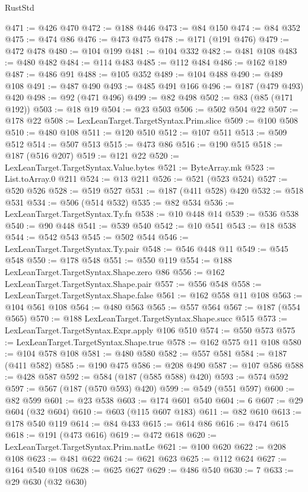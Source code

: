 \begin{lexlean}{RustStd}
\begin{coremodule}
{\begin{coremodule}
{{{{{{{{{{{{{{{{{{{{{{{{{{{{{{{{{{{{{{{{{{{{{{{{{{{{{{{@471 := @426 @470
@472 := @188 @446
@473 := @84 @150
@474 := @84 @352
@475 := @474 @86
@476 := @473 @475
@478 := @171 (@191 @476)
@479 := @472 @478
@480 := @104 @199
@481 := @104 @332
@482 := @481 @108
@483 := @480 @482
@484 := @114 @483
@485 := @112 @484
@486 := @162 @189
@487 := @486 @91
@488 := @105 @352
@489 := @104 @488
@490 := @489 @108
@491 := @487 @490
@493 := @485 @491 @166
@496 := @187 (@479 @493) @420
@498 := @92 (@471 @496)
@499 := @82 @498
@502 := @83 (@85 (@171 @192))
@503 := @18 @19
@504 := @23 @503
@506 := @502 @504 @22
@507 := @178 @22
@508 := LexLeanTarget.TargetSyntax.Prim.slice
@509 := @100 @508
@510 := @480 @108
@511 := @120 @510
@512 := @107 @511
@513 := @509 @512
@514 := @507 @513
@515 := @473 @86
@516 := @190 @515
@518 := @187 (@516 @207)
@519 := @121 @22
@520 := LexLeanTarget.TargetSyntax.Value.bytes
@521 := ByteArray.mk
@523 := List.toArray.{0} @211
@524 := @13 @211
@526 := @521 (@523 @524)
@527 := @520 @526
@528 := @519 @527
@531 := @187 (@411 @528) @420
@532 := @518 @531
@534 := @506 (@514 @532)
@535 := @82 @534
@536 := LexLeanTarget.TargetSyntax.Ty.fn
@538 := @10 @448 @14
@539 := @536 @538
@540 := @90 @448
@541 := @539 @540
@542 := @10 @541
@543 := @18 @538
@544 := @542 @543
@545 := @502 @544
@546 := LexLeanTarget.TargetSyntax.Ty.pair
@548 := @546 @448 @11
@549 := @545 @548
@550 := @178 @548
@551 := @550 @119
@554 := @188 LexLeanTarget.TargetSyntax.Shape.zero @86
@556 := @162 LexLeanTarget.TargetSyntax.Shape.pair
@557 := @556 @548
@558 := LexLeanTarget.TargetSyntax.Shape.false
@561 := @162 @558 @11 @108
@563 := @104 @561 @108
@564 := @480 @563
@565 := @557 @564
@567 := @187 (@554 @565)
@570 := @188 LexLeanTarget.TargetSyntax.Shape.succ @515
@573 := LexLeanTarget.TargetSyntax.Expr.apply @106 @510
@574 := @550 @573
@575 := LexLeanTarget.TargetSyntax.Shape.true
@578 := @162 @575 @11 @108
@580 := @104 @578 @108
@581 := @480 @580
@582 := @557 @581
@584 := @187 (@411 @582)
@585 := @190 @475
@586 := @208 @490
@587 := @107 @586
@588 := @428 @587
@592 := @584 (@187 (@585 @588) @420)
@593 := @574 @592
@597 := @567 (@187 (@570 @593) @420)
@599 := @549 (@551 @597)
@600 := @82 @599
@601 := @23 @538
@603 := @174 @601 @540
@604 := 6
@607 := @29 @604 (@32 @604)
@610 := @603 (@115 @607 @183)
@611 := @82 @610
@613 := @178 @540 @119
@614 := @84 @433
@615 := @614 @86
@616 := @474 @615
@618 := @191 (@473 @616)
@619 := @472 @618
@620 := LexLeanTarget.TargetSyntax.Prim.natLe
@621 := @100 @620
@622 := @208 @108
@623 := @481 @622
@624 := @621 @623
@625 := @112 @624
@627 := @164 @540 @108
@628 := @625 @627
@629 := @486 @540
@630 := 7
@633 := @29 @630 (@32 @630)
}}}}}}}}}}}}}}}}}}}}}}}}}}}}}}}}}}}}}}}}}}}}}}}}}}}}}}}
\end{coremodule}}
\end{coremodule}
\end{lexlean}
